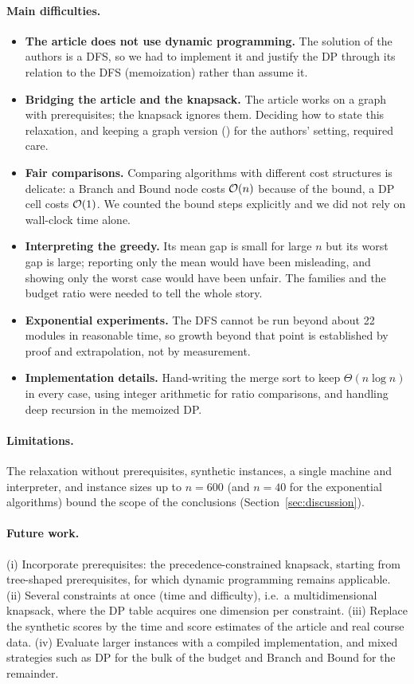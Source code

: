 \paragraph{Main difficulties.}
\begin{itemize}[leftmargin=1.4em,itemsep=2pt]
\item \textbf{The article does not use dynamic programming.} The solution of the authors is a DFS, so we had to implement it and justify the DP through its relation to the DFS (memoization) rather than assume it.
\item \textbf{Bridging the article and the knapsack.} The article works on a graph with prerequisites; the knapsack ignores them. Deciding how to state this relaxation, and keeping a graph version () for the authors' setting, required care.
\item \textbf{Fair comparisons.} Comparing algorithms with different cost structures is delicate: a Branch and Bound node costs $\mathcal{O}(n)$ because of the bound, a DP cell costs $\mathcal{O}(1)$. We counted the bound steps explicitly and we did not rely on wall-clock time alone.
\item \textbf{Interpreting the greedy.} Its mean gap is small for large $n$ but its worst gap is large; reporting only the mean would have been misleading, and showing only the worst case would have been unfair. The families and the budget ratio were needed to tell the whole story.
\item \textbf{Exponential experiments.} The DFS cannot be run beyond about 22 modules in reasonable time, so growth beyond that point is established by proof and extrapolation, not by measurement.
\item \textbf{Implementation details.} Hand-writing the merge sort to keep $\Theta(n\log n)$ in every case, using integer arithmetic for ratio comparisons, and handling deep recursion in the memoized DP.
\end{itemize}

\paragraph{Limitations.} The relaxation without prerequisites, synthetic instances, a single machine and interpreter, and instance sizes up to $n=600$ (and $n=40$ for the exponential algorithms) bound the scope of the conclusions (Section~\ref{sec:discussion}).

\paragraph{Future work.} (i) Incorporate prerequisites: the precedence-constrained knapsack, starting from tree-shaped prerequisites, for which dynamic programming remains applicable. (ii) Several constraints at once (time and difficulty), i.e.\ a multidimensional knapsack, where the DP table acquires one dimension per constraint. (iii) Replace the synthetic scores by the time and score estimates of the article and real course data. (iv) Evaluate larger instances with a compiled implementation, and mixed strategies such as DP for the bulk of the budget and Branch and Bound for the remainder.
